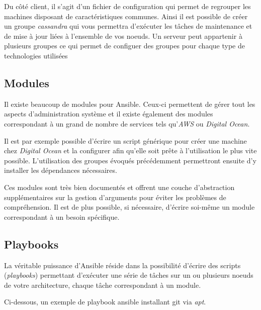 \bigskip

Du côté client, il s'agit d'un fichier de configuration qui permet de
regrouper les machines disposant de caractéristiques communes. Ainsi il
est possible de créer un groupe \emph{cassandra} qui vous permettra
d'exécuter les tâches de maintenance et de mise à jour liées à
l'ensemble de vos noeuds. Un serveur peut appartenir à plusieurs groupes
ce qui permet de configuer des groupes pour chaque type de technologies
utilisées

\newpage

\subsection{Modules}\label{modules}

\bigskip

Il existe beaucoup de modules pour Ansible. Ceux-ci permettent de gérer
tout les aspects d'administration système et il existe également des
modules correspondant à un grand de nombre de services tels
qu'\emph{AWS} ou \emph{Digital Ocean}.

\bigskip

Il est par exemple possible d'écrire un script générique pour créer une
machine chez \emph{Digital Ocean} et la configurer afin qu'elle soit
prête à l'utilisation le plus vite possible. L'utilisation des groupes
évoqués précédemment permettront ensuite d'y installer les dépendances
nécessaires.

\bigskip

Ces modules sont très bien documentés et offrent une couche
d'abstraction supplémentaires sur la gestion d'arguments pour éviter les
problèmes de compréhension. Il est de plus possible, si nécessaire,
d'écrire soi-même un module correspondant à un besoin spécifique.

\newpage

\subsection{Playbooks}\label{playbooks}

\bigskip

La véritable puissance d'Ansible réside dans la possibilité d'écrire des
scripts (\emph{playbooks}) permettant d'exécuter une série de tâches sur
un ou plusieurs noeuds de votre architecture, chaque tâche correspondant
à un module.

\bigskip

Ci-dessous, un exemple de playbook ansible installant git via
\emph{apt}.

